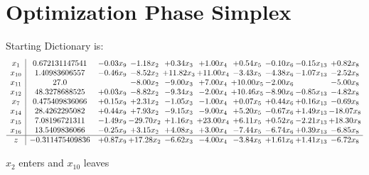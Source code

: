\documentclass[9pt]{article}
\begin{document}
\section{Optimization Phase Simplex}
Starting Dictionary is:
\[\begin{array}{c| c c@{\hskip 2pt} c@{\hskip 2pt} c@{\hskip 2pt} c@{\hskip 2pt} c@{\hskip 2pt} c@{\hskip 2pt} c@{\hskip 2pt} c@{\hskip 2pt} }
 x_{1}   &  0.672131147541 & -0.03 x_{9} & -1.18 x_{2} & +  0.34 x_{3} & +  1.00 x_{4} & +  0.54 x_{5} & -0.10 x_{6} & -0.15 x_{13} & +  0.82 x_{8}\\
 x_{10}   &  1.40983606557 & -0.46 x_{9} & -8.52 x_{2} & + 11.82 x_{3} & + 11.00 x_{4} & -3.43 x_{5} & -4.38 x_{6} & -1.07 x_{13} & -2.52 x_{8}\\
 x_{11}   &  27.0  &   & -8.00 x_{2} & -9.00 x_{3} & +  7.00 x_{4} & + 10.00 x_{5} & -2.00 x_{6} &   & -5.00 x_{8}\\
 x_{12}   &  48.3278688525 & +  0.03 x_{9} & -8.82 x_{2} & -9.34 x_{3} & -2.00 x_{4} & + 10.46 x_{5} & -8.90 x_{6} & -0.85 x_{13} & -4.82 x_{8}\\
 x_{7}   &  0.475409836066 & +  0.15 x_{9} & +  2.31 x_{2} & -1.05 x_{3} & -1.00 x_{4} & +  0.07 x_{5} & +  0.44 x_{6} & +  0.16 x_{13} & -0.69 x_{8}\\
 x_{14}   &  28.4262295082 & +  0.44 x_{9} & +  7.93 x_{2} & -9.15 x_{3} & -9.00 x_{4} & +  5.20 x_{5} & -0.67 x_{6} & +  1.49 x_{13} & -18.07 x_{8}\\
 x_{15}   &  7.08196721311 & -1.49 x_{9} & -29.70 x_{2} & +  1.16 x_{3} & + 23.00 x_{4} & +  6.11 x_{5} & +  0.52 x_{6} & -2.21 x_{13} & + 18.30 x_{8}\\
 x_{16}   &  13.5409836066 & -0.25 x_{9} & +  3.15 x_{2} & +  4.08 x_{3} & +  3.00 x_{4} & -7.44 x_{5} & -6.74 x_{6} & +  0.39 x_{13} & -6.85 x_{8}\\
\hline
z    &  -0.311475409836 & +  0.87 x_{9} & + 17.28 x_{2} & -6.62 x_{3} & -4.00 x_{4} & -3.84 x_{5} & +  1.61 x_{6} & +  1.41 x_{13} & -6.72 x_{8}\\
\end{array}\]


 $ x_{2} $ enters and $ x_{10} $ leaves 
\end{document}
